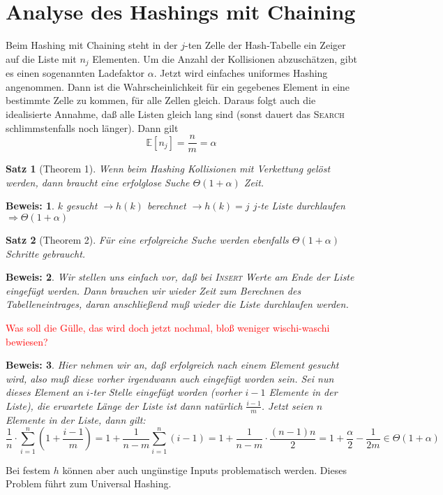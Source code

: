 \documentclass[ngerman,draft,parskip=half*,twoside]{scrreprt}
\theoremstyle{break}
\newtheorem{satz}{Satz}[chapter]
\theoremstyle{nonumberbreak}
\newtheorem{beweis}{Beweis:}
\begin{document}
\section{Analyse des Hashings mit Chaining}
Beim Hashing mit Chaining steht in der $j$-ten Zelle der Hash-Tabelle ein Zeiger auf die Liste mit $n_j$ Elementen. Um
die Anzahl der Kollisionen abzuschätzen, gibt es einen sogenannten Ladefaktor $\alpha$.
Jetzt wird einfaches uniformes Hashing angenommen. Dann ist die Wahrscheinlichkeit für ein gegebenes Element in eine bestimmte
Zelle zu kommen, für alle Zellen gleich. Daraus folgt auch die idealisierte Annahme, daß alle Listen gleich lang sind
(sonst dauert das \textsc{Search} schlimmstenfalls noch länger). Dann gilt \[\mathbb{E}[n_j]=\frac{n}{m}=\alpha\]

\begin{satz}[Theorem 1]
Wenn beim Hashing Kollisionen mit Verkettung gelöst werden, dann braucht eine erfolglose Suche $\Theta(1+\alpha)$
Zeit.
\end{satz}
\begin{beweis}
$k$ gesucht $\rightarrow h(k)$ berechnet $\rightarrow h(k)=j$ $j$-te Liste durchlaufen $\Rightarrow \Theta(1+\alpha)$
\end{beweis}

\begin{satz}[Theorem 2]
Für eine erfolgreiche Suche werden ebenfalls $\Theta(1+\alpha)$ Schritte gebraucht.
\end{satz}
\begin{beweis}
Wir stellen uns einfach vor, daß bei \textsc{Insert} Werte am Ende der Liste eingefügt werden. Dann brauchen wir
wieder Zeit zum Berechnen des Tabelleneintrages, daran anschließend muß wieder die Liste durchlaufen werden.
\end{beweis} \textcolor{red}{Was soll die Gülle, das wird doch jetzt nochmal, bloß weniger wischi-waschi bewiesen?}
\begin{beweis}
Hier nehmen wir an, daß erfolgreich nach einem Element gesucht wird, also muß diese vorher irgendwann auch eingefügt
worden sein. Sei nun dieses Element an $i$-ter Stelle eingefügt worden (vorher $i-1$ Elemente in der Liste), die
erwartete Länge der Liste ist dann natürlich $\frac{i-1}{m}$. Jetzt seien $n$ Elemente in der Liste, dann gilt:
\[\frac{1}{n} \cdot \sum_{i=1}^n \left(1+\frac{i-1}{m}\right)=1+\frac{1}{n-m} \sum_{i=1}^n (i-1)=1+\frac{1}{n-m} \cdot
\frac{(n-1)n}{2}=1+\frac{\alpha}{2}-\frac{1}{2m} \in \Theta(1+\alpha)\]
\end{beweis}
Bei festem $h$ können aber auch ungünstige Inputs problematisch werden. Dieses Problem führt zum Universal Hashing.
\end{document}
